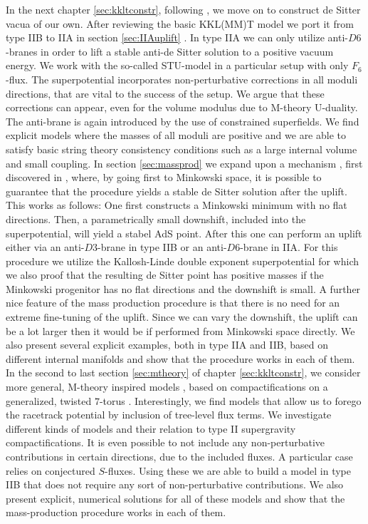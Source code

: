 \documentclass[a4paper,12pt]{report}
\begin{document}
In the next chapter \ref{sec:kkltconstr}, following \cite{Cribiori:2019bfx,Cribiori:2019drf,Cribiori:2019hrb}, we move on to construct de Sitter vacua of our own. After reviewing the basic KKL(MM)T model \cite{Kachru:2003aw,Kachru:2003sx} we  port it from type IIB to IIA in section \ref{sec:IIAuplift} \cite{Cribiori:2019bfx}. In type IIA we can only utilize anti-$D6$-branes in order to lift a stable anti-de Sitter solution to a positive vacuum energy. We work with the so-called STU-model in a particular setup with only $F_6$-flux. The superpotential incorporates non-perturbative corrections in all moduli directions, that are vital to the success of the setup. We argue that these corrections can appear, even for the volume modulus due to M-theory U-duality. The anti-brane is again introduced by the use of constrained superfields. We find explicit models where the masses of all moduli are positive and we are able to satisfy basic string theory consistency conditions such as a large internal volume and small coupling. In section \ref{sec:massprod} we expand upon a mechanism \cite{Cribiori:2019drf}, first discovered in \cite{Kallosh:2019zgd}, where, by going first to Minkowski space, it is possible to guarantee that the procedure yields a stable de Sitter solution after the uplift. This works as follows: One first constructs a Minkowski minimum with no flat directions. Then, a parametrically small downshift, included into the superpotential, will yield a stabel AdS point. After this one can perform an uplift either via an anti-$D3$-brane in type IIB or an anti-$D6$-brane in IIA. For this procedure we utilize the Kallosh-Linde double exponent superpotential \cite{Kallosh:2004yh} for which we also proof that the resulting de Sitter point has positive masses if the Minkowski progenitor has no flat directions and the downshift is small. A further nice feature of the mass production procedure is that there is no need for an extreme fine-tuning of the uplift. Since we can vary the downshift, the uplift can be a lot larger then it would be if performed from Minkowski space directly. We also present several explicit examples, both in type IIA and IIB, based on different internal manifolds and show that the procedure works in each of them. In the second to last section \ref{sec:mtheory} of chapter \ref{sec:kkltconstr}, we consider more general, M-theory inspired models \cite{Cribiori:2019hrb}, based on compactifications on a generalized, twisted $7$-torus \cite{DallAgata:2005zlf,Duff:2010vy,Derendinger:2014wwa,Ferrara:2016fwe}. Interestingly, we find models that allow us to forego the racetrack potential by inclusion of tree-level flux terms. We investigate different kinds of models and their relation to type II supergravity compactifications. It is even possible to not include any non-perturbative contributions in certain directions, due to the included fluxes. A particular case relies on conjectured $S$-fluxes. Using these we are able to build a model in type IIB that does not require any sort of non-perturbative contributions. We also present explicit, numerical solutions for all of these models and show that the mass-production procedure works in each of them.\\
\end{document}
